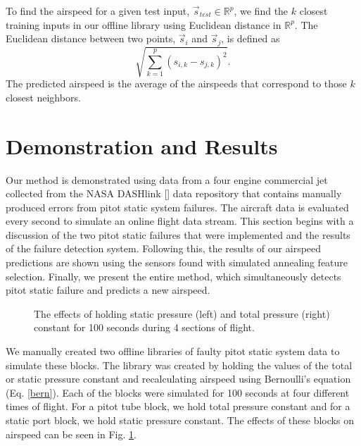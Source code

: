 \documentclass[]{aiaa-tc}
\begin{document}
To find the airspeed for a given test input, $\vec{s}_{test} \in \mathbb{R}^p$, we find the $k$ closest training inputs in our offline library using Euclidean distance in $\mathbb{R}^p$. The Euclidean distance between two points, $\vec{s}_i$ and $\vec{s}_j$, is defined as $$\sqrt{\displaystyle \sum_{k=1}^p (s_{i,k}-s_{j,k})^2}.$$ The predicted airspeed is the average of the airspeeds that correspond to those $k$ closest neighbors.


\section{Demonstration and Results}
\label{sec:demo}
\label{sec:results}


Our method is demonstrated using data from a four engine commercial jet collected from the NASA DASHlink [] data repository that contains manually produced errors from pitot static system failures. The aircraft data is evaluated every second to simulate an online flight data stream. This section begins with a discussion of the two pitot static failures that were implemented and the results of the failure detection system. Following this, the results of our airspeed predictions are shown using the sensors found with simulated annealing feature selection. Finally, we present the entire method, which simultaneously detects pitot static failure and predicts a new airspeed.

\begin{figure}[h!]
 \begin{subfigmatrix}{2}%
 \end{subfigmatrix}
 \caption{The effects of holding static pressure (left) and total pressure (right) constant for 100 seconds during 4 sections of flight.}
 \label{fig:airspeeds}
\end{figure}

We manually created two offline libraries of faulty pitot static system data to simulate these blocks. The library was created by holding the values of the total or static pressure constant and recalculating airspeed using Bernoulli's equation (Eq. \ref{bern}). Each of the blocks were simulated for 100 seconds at four different times of flight. For a pitot tube block, we hold total pressure constant and for a static port block, we hold static pressure constant. The effects of these blocks on airspeed can be seen in Fig. \ref{fig:airspeeds}.
\end{document}
